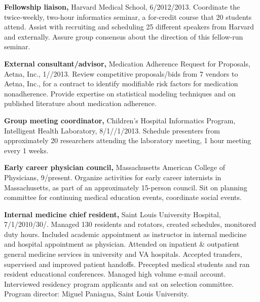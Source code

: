 \documentclass[12pt]{article}
\begin{document}
\textbf{Fellowship liaison,} Harvard Medical School,
6/2012/2013. Coordinate the twice-week\-ly, two-hour
informatics seminar, a for-credit course that 20 students attend.
Assist with recruiting and scheduling 25 different speakers from
Harvard and externally. Assure group consensus about the direction of
this fellow-run seminar.

\textbf{External consultant/advisor,} Medication Adherence Request for
Proposals, Aetna, Inc.,
1/\ndash{}/2013. Review competitive
proposals/bids from 7 vendors to Aetna, Inc., for a contract to
identify modifiable risk factors for medication nonadherence. Provide
expertise on statistical modeling techniques and on published
literature about medication adherence.

\textbf{Group meeting coordinator,} Children’s Hospital Informatics
Program, Intel\-li\-gent Health Lab\-o\-ra\-to\-ry,
8/1/\ndash{}/1/2013. Schedule
presenters from approximately 20 researchers attending the laboratory
meeting, 1 hour meeting every 1 weeks.

\textbf{Early career physician council,} Massachusetts American
College of Physicians,
9/\ndash{}\linebreak[0]pres\-ent. Organize activities
for early career internists in Massachusetts, as part of an
approximately 15-person council. Sit on planning committee for
continuing medical education events, coordinate social events.

\textbf{Internal medicine chief resident,} Saint Louis University
Hospital, 7/1/2010\ndash{}/30/. Managed
130 residents and rotators, created schedules, monitored duty hours.
Included academic appointment as instructor in internal medicine and
hospital appointment as physician. Attended on inpatient \& outpatient
general medicine services in university and VA hospitals. Accepted
transfers, supervised and improved patient handoffs. Precepted medical
students and ran resident educational conferences. Managed high volume
e-mail account. Interviewed residency program applicants and sat on
selection committee. Program director: Miguel Paniagua, Saint Louis
University.
\end{document}
